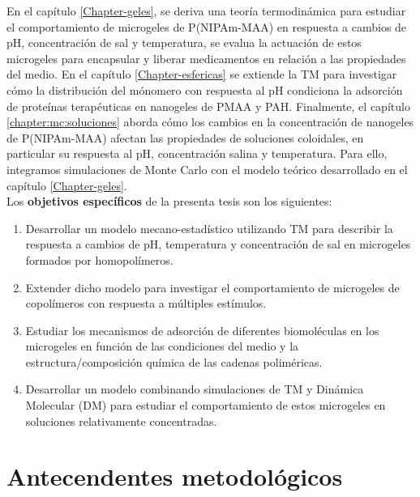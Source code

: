 En el cap\'itulo \ref{Chapter-geles}, se deriva una teor\'ia termodin\'amica para estudiar el comportamiento de microgeles de P(NIPAm-MAA) en respuesta a cambios de pH, concentraci\'on de sal y temperatura, se evalua la actuaci\'on de estos microgeles para encapsular y liberar medicamentos en relaci\'on a las propiedades del medio. En el cap\'itulo \ref{Chapter-esfericas} se extiende la TM para investigar c\'omo la distribuci\'on del m\'onomero con respuesta al pH condiciona la adsorci\'on de prote\'inas terap\'euticas en nanogeles de PMAA y PAH.
Finalmente, el cap\'itulo \ref{chapter:mc:soluciones} aborda c\'omo los cambios en la concentraci\'on de nanogeles de P(NIPAm-MAA) afectan las propiedades de soluciones coloidales, en particular su respuesta al pH, concentraci\'on salina y temperatura. Para ello, integramos simulaciones de Monte Carlo con el modelo te\'orico desarrollado en el  cap\'itulo \ref{Chapter-geles}.\\

Los {\bf objetivos espec\'ificos} de la presenta tesis son los siguientes:
%
\begin{enumerate}
	\item Desarrollar un modelo mecano-estad\'istico utilizando TM para describir la respuesta a cambios de pH, temperatura y concentraci\'on de sal en microgeles formados por homopol\'imeros.\label{objetivo_1}
	\item Extender dicho modelo para investigar el comportamiento de microgeles de copol\'imeros con respuesta a m\'ultiples est\'imulos.\label{objetivo_2}
	\item Estudiar los mecanismos de adsorci\'on de diferentes biomol\'eculas en los microgeles en funci\'on de las condiciones del medio y la estructura/composici\'on qu\'imica de las cadenas polim\'ericas.\label{objetivo_3}
	\item Desarrollar un modelo combinando simulaciones de TM y Din\'amica Molecular (DM) para estudiar el comportamiento de estos microgeles en soluciones relativamente concentradas.\label{objetivo_4}
\end{enumerate}

\section{Antecendentes metodol\'ogicos}\label{sec:intro:metodologicos}

